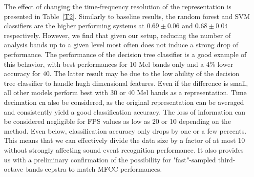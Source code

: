 \documentclass[final,3p,times,twocolumn]{elsarticle}
\begin{document}
The effect of changing the time-frequency resolution of the representation is presented in Table~\ref{T2}. Similarly to baseline results, the random forest and SVM classifiers are the higher performing systems at $0.69\pm 0.06$ and $0.68\pm 0.04$ respectively. However, we find that given our setup, reducing the number of analysis bands up to a given level most often does not induce a strong drop of performance. The performance of the decision tree classifier is a good example of this behavior, with best performances for 10 Mel bands only and a 4\% lower accuracy for 40. The latter result may be due to the low ability of the decision tree classifier to handle hugh dimensional features. Even if the difference is small, all other models perform best with 30 or 40 Mel bands as a representation. Time decimation cn also be considered, as the original representation can be averaged and consistently yield a good classification accuracy. The loss of information can be considered negligible for FPS values as low as 20 or 10 depending on the method. Even below, classification accuracy only drops by one or a few percents. This means that we can effectively divide the data size by a factor of at most 10 without strongly affecting sound event recognition performance. It also provides us with a preliminary confirmation of the possibility for "fast"-sampled third-octave bands cepstra to match  MFCC performances.\\
\end{document}
